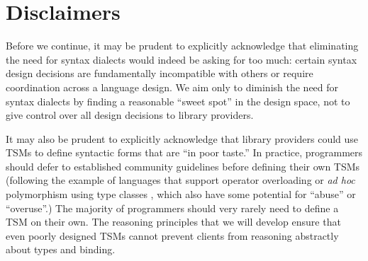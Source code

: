 \section{Disclaimers}
Before we continue, it may be prudent to explicitly acknowledge that eliminating the need for syntax dialects would indeed be asking for too much: certain syntax design decisions are fundamentally incompatible with others or require coordination across a language design. We aim only to diminish the need for syntax dialects by finding a reasonable ``sweet spot'' in the design space, not to give control over all design decisions to library providers. %

It may also be prudent to explicitly acknowledge that library providers could use TSMs  to define syntactic forms that are ``in poor taste.'' In practice, programmers should defer to established community guidelines before defining their own TSMs (following the example of languages that support operator overloading or \emph{ad hoc} polymorphism using type classes \cite{Hall:1996:TCH:227699.227700,conf/popl/DreyerHCK07}, which also have some potential for ``abuse'' or ``overuse''.) %
The majority of programmers should very rarely need to define a TSM on their own. The reasoning principles that we will develop ensure that even poorly designed TSMs cannot prevent clients from reasoning abstractly about types and binding.

